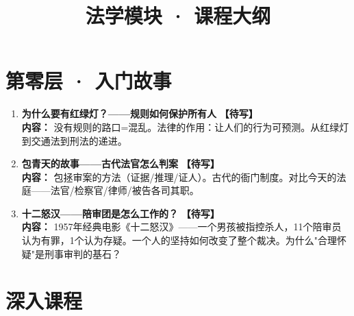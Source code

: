 \documentclass[a4paper,11pt]{ctexart}
\title{\textcolor{blue!70!black}{\Huge\textbf{法学模块 · 课程大纲}}}
\author{}
\date{}
\newcommand{\draft}{\textcolor{orange!80!black}{\textbf{【待写】}}}
\begin{document}
\maketitle
\thispagestyle{empty}

\section*{第零层 · 入门故事}

\begin{enumerate}
\item[\textbf{第1课}] \textbf{为什么要有红绿灯？——规则如何保护所有人} \draft \\
\textbf{内容：} 没有规则的路口=混乱。法律的作用：让人们的行为可预测。从红绿灯到交通法到刑法的递进。
\item[\textbf{第2课}] \textbf{包青天的故事——古代法官怎么判案} \draft \\
\textbf{内容：} 包拯审案的方法（证据/推理/证人）。古代的衙门制度。对比今天的法庭——法官/检察官/律师/被告各司其职。
\item[\textbf{第3课}] \textbf{十二怒汉——陪审团是怎么工作的？} \draft \\
\textbf{内容：} 1957年经典电影《十二怒汉》——一个男孩被指控杀人，11个陪审员认为有罪，1个认为存疑。一个人的坚持如何改变了整个裁决。为什么"合理怀疑"是刑事审判的基石？
\end{enumerate}

\section*{深入课程}
\end{document}
